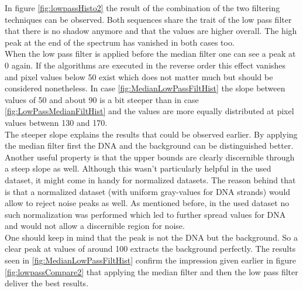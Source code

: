 \documentclass{article}
\begin{document}
In figure \ref{fig:lowpassHisto2} the result of the combination of the two filtering techniques can be observed. Both sequences share the trait of the low pass filter that there is no shadow anymore and that the values are higher overall. The high peak at the end of the spectrum has vanished in both cases too. \\
When the low pass filter is applied before the median filter one can see a peak at 0 again. If the algorithms are executed in the reverse order this effect vanishes and pixel values below 50 exist which does not matter much but should be considered nonetheless. In case \ref{fig:MedianLowPassFiltHist} the slope between values of 50 and about 90 is a bit steeper than in case \ref{fig:LowPassMedianFiltHist} and the values are more equally distributed at pixel values betwenn 130 and 170. \\
The steeper slope explains the results that could be observed earlier. By applying the median filter first the DNA and the background can be distinguished better. Another useful property is that the upper bounds are clearly discernible through a steep slope as well. Although this wasn't particularly helpful in the used dataset, it might come in handy for normalized datasets. The reason behind that is that a normalized dataset (with uniform gray-values for DNA strands) would allow to reject noise peaks as well. As mentioned before, in the used dataset no such normalization was performed which led to further spread values for DNA and would not allow a discernible region for noise.
\\ One should keep in mind that the peak is not the DNA but the background. So a clear peak at values of around 100 extracts the background perfectly. The results seen in \ref{fig:MedianLowPassFiltHist} confirm the impression given earlier in figure \ref{fig:lowpassCompare2} that applying the median filter and then the low pass filter deliver the best results.


\iffalse
\newpage
\end{document}
